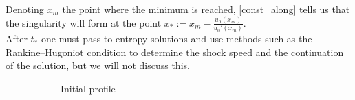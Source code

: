 \documentclass[11pt,a4paper]{article}
\begin{document}
\noindent Denoting $x_m$ the point where the minimum is reached,  \eqref{const_along} tells us that the singularity will form at the point $x_* := x_m - \frac{u_0(x_m)}{u_0'(x_m)}$. \\
After $t_*$ one must pass to entropy solutions and use methods such as the Rankine--Hugoniot condition to determine the shock speed and the continuation of the solution, but we will not discuss this.

\begin{figure}[ht]
  \centering
  \begin{subfigure}[b]{0.32\textwidth}
    \caption{Initial profile}
  \end{subfigure}\hfill
  \begin{subfigure}[b]{0.32\textwidth}

\end{subfigure}
\end{figure}
\end{document}
